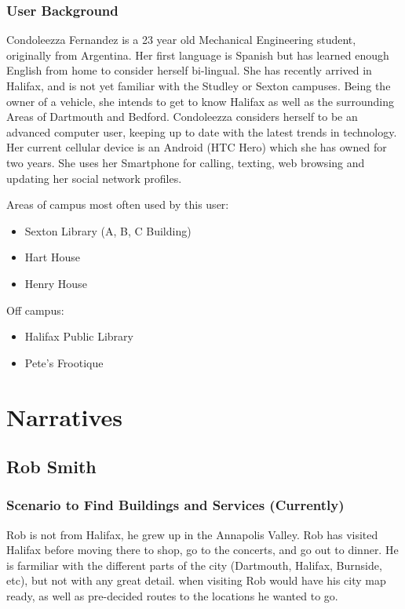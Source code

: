 \documentclass{article}
\begin{document}
\subsubsection{User Background}
Condoleezza Fernandez is a 23 year old Mechanical Engineering student,
originally from Argentina. Her first language is Spanish but has learned enough
English from home to consider herself bi-lingual. She has recently arrived in
Halifax, and is not yet familiar with the Studley or Sexton campuses. Being the
owner of a vehicle, she intends to get to know Halifax as well as the
surrounding Areas of Dartmouth and Bedford.  Condoleezza considers herself to be
an advanced computer user, keeping up to date with the latest trends in
technology. Her current cellular device is an Android (HTC Hero) which she has
owned for two years.  She uses her Smartphone for calling, texting, web browsing
and updating her social network profiles. 

Areas of campus most often used by this user:
\begin{itemize}
\item Sexton Library (A, B, C Building) 
\item Hart House 
\item Henry House
\end{itemize}

Off campus:
\begin{itemize}
\item Halifax Public Library
\item Pete’s Frootique
\end{itemize}

\section{Narratives}
\subsection{Rob Smith}
\subsubsection{Scenario to Find Buildings and Services (Currently)}

Rob is not from Halifax, he grew up in the Annapolis Valley. Rob has visited
Halifax before moving there to shop, go to the concerts, and go out to dinner.
He is farmiliar with the different parts of the city (Dartmouth, Halifax,
Burnside, etc), but not with any great detail. when visiting Rob would have his
city map ready, as well as pre-decided routes to the locations he wanted to go.
\end{document}
